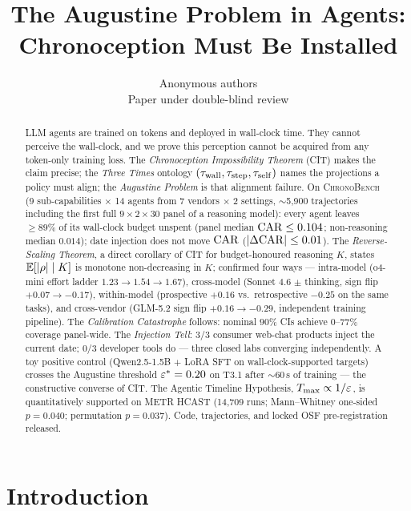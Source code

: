 \documentclass{article}
\title{The Augustine Problem in Agents:\\Chronoception Must Be Installed}
\author{Anonymous authors\\Paper under double-blind review}
\begin{document}
\maketitle

\begin{abstract}
LLM agents are trained on tokens and deployed in wall-clock time. They cannot perceive the wall-clock, and we prove this perception cannot be acquired from any token-only training loss. The \emph{Chronoception Impossibility Theorem} (CIT) makes the claim precise; the \emph{Three Times} ontology $(\tau_{\mathrm{wall}}, \tau_{\mathrm{step}}, \tau_{\mathrm{self}})$ names the projections a policy must align; the \emph{Augustine Problem} is that alignment failure. On \textsc{ChronoBench} (9 sub-capabilities $\times$ 14 agents from 7 vendors $\times$ 2 settings, $\sim$5{,}900 trajectories including the first full $9\!\times\!2\!\times\!30$ panel of a reasoning model): every agent leaves $\geq 89\%$ of its wall-clock budget unspent (panel median $\mathrm{CAR} \leq 0.104$; non-reasoning median $0.014$); date injection does not move $\mathrm{CAR}$ ($|\Delta\mathrm{CAR}| \leq 0.01$). The \emph{Reverse-Scaling Theorem}, a direct corollary of CIT for budget-honoured reasoning $K$, states $\mathbb{E}[|\rho|\mid K]$ is monotone non-decreasing in $K$; confirmed four ways --- intra-model (o4-mini effort ladder $1.23 \to 1.54 \to 1.67$), cross-model (Sonnet 4.6 $\pm$ thinking, sign flip $+0.07 \to -0.17$), within-model (prospective $+0.16$ vs.\ retrospective $-0.25$ on the same tasks), and cross-vendor (GLM-5.2 sign flip $+0.16 \to -0.29$, independent training pipeline). The \emph{Calibration Catastrophe} follows: nominal $90\%$ CIs achieve $0$--$77\%$ coverage panel-wide. The \emph{Injection Tell}: 3/3 consumer web-chat products inject the current date; 0/3 developer tools do --- three closed labs converging independently. A toy positive control (Qwen2.5-1.5B $+$ LoRA SFT on wall-clock-supported targets) crosses the Augustine threshold $\varepsilon^{*} = 0.20$ on T3.1 after $\sim$60\,s of training --- the constructive converse of CIT. The Agentic Timeline Hypothesis, $T_{\max} \propto 1/\varepsilon$, is quantitatively supported on METR HCAST (14{,}709 runs; Mann--Whitney one-sided $p = 0.040$; permutation $p = 0.037$). Code, trajectories, and locked OSF pre-registration released.
\end{abstract}

\section{Introduction}\label{sec:intro}
\end{document}
